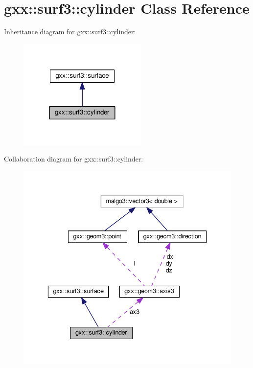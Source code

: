 \hypertarget{classgxx_1_1surf3_1_1cylinder}{}\section{gxx\+:\+:surf3\+:\+:cylinder Class Reference}
\label{classgxx_1_1surf3_1_1cylinder}


Inheritance diagram for gxx\+:\+:surf3\+:\+:cylinder\+:
\nopagebreak
\begin{figure}[H]
\begin{center}
\leavevmode
\includegraphics[width=180pt]{classgxx_1_1surf3_1_1cylinder__inherit__graph}
\end{center}
\end{figure}


Collaboration diagram for gxx\+:\+:surf3\+:\+:cylinder\+:
\nopagebreak
\begin{figure}[H]
\begin{center}
\leavevmode
\includegraphics[width=336pt]{classgxx_1_1surf3_1_1cylinder__coll__graph}
\end{center}
\end{figure}
